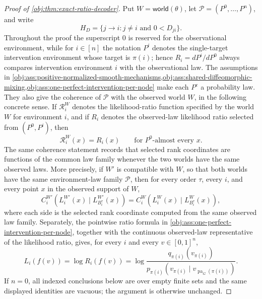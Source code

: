 \begin{proof}[Proof of \cref{obj:thm:exact-ratio-decoder}]
Put \(W=\mathsf{world}(\theta)\), let \(\mathcal P=(P^0,\ldots,P^n)\), and write
\[
H_D=\{j\to i:j\ne i\text{ and }0<D_{ji}\}.
\]
Throughout the proof the superscript \(0\) is reserved for the observational environment, while for \(i\in[n]\) the notation \(P^i\) denotes the single-target intervention environment whose target is \(\pi(i)\); hence \(R_i=dP^i/dP^0\) always compares intervention environment \(i\) with the observational law. The assumptions in \cref{obj:ass:positive-normalized-smooth-mechanisms,obj:ass:shared-diffeomorphic-mixing,obj:ass:one-perfect-intervention-per-node} make each \(P^e\) a probability law. They also give the coherence of \(\mathcal P\) with the observed world \(W\), in the following concrete sense. If \(\mathcal R_i^W\) denotes the likelihood-ratio function specified by the world \(W\) for environment \(i\), and if \(R_i\) denotes the observed-law likelihood ratio selected from \((P^0,
P^i)\), then
\[
\mathcal R_i^W(x)=R_i(x)
\qquad\text{for }P^0\text{-almost every }x.
\]
The same coherence statement records that selected rank coordinates are functions of the common law family whenever the two worlds have the same observed laws. More precisely, if \(W'\) is compatible with \(W\), so that both worlds have the same environment-law family \(\mathcal P\), then for every order \(\tau\), every \(i\), and every point \(x\) in the observed support of \(W\),
\[
C_i^{W'}\!\left(L_i^{W'}(x)\mid L_{B_i^\tau}^{W'}(x)\right)
=
C_i^{W}\!\left(L_i^{W}(x)\mid L_{B_i^\tau}^{W}(x)\right),
\]
where each side is the selected rank coordinate computed from the same observed law family. Separately, the pointwise ratio formula in \cref{obj:ass:one-perfect-intervention-per-node}, together with the continuous observed-law representative of the likelihood ratio, gives, for every \(i\) and every \(v\in[0,1]^n\),
\begin{equation}
L_i(f(v))
=
\log R_i(f(v))
=
\log
\frac{q_{\pi(i)}(v_{\pi(i)})}
{p_{\pi(i)}(v_{\pi(i)}\mid v_{\operatorname{pa}_G(\pi(i))})}.
\label{eq:exact-ratio-decoder-log-ratio}
\end{equation}
If \(n=0\), all indexed conclusions below are over empty finite sets and the same displayed identities are vacuous; the argument is otherwise unchanged. %


\end{proof}
